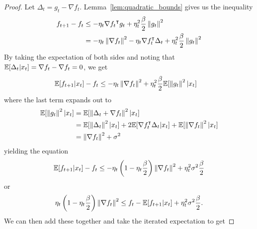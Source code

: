 \begin{proof}
    Let $\Delta_t = g_t - \nabla f_t$. Lemma~\ref{lem:quadratic_bounds} gives us
    the inequality
    \begin{equation}
        \begin{aligned}
            f_{t+1} - f_t &\leq - \eta_t {\nabla f_t}^\intercal g_t +
            \eta_t^2\frac{\beta}{2} \left\| g_t \right\|^2 \\
            &= - \eta_t \left\| \nabla f_t \right\|^2 - \eta_t \nabla f_t^\intercal \Delta_t +
            \eta_t^2\frac{\beta}{2} \left\| g_t \right\|^2
        \end{aligned}
    \end{equation}
    By taking the expectation of both sides and noting that $\mathbb E[\Delta_t |
    x_t] = \nabla f_t - \nabla f_t = 0$, we get
    \begin{equation}
        \begin{aligned}
            \mathbb E[f_{t+1} | x_t] - f_t &\leq - \eta_t \left\| \nabla f_t \right\|^2 +
            \eta_t^2\frac{\beta}{2} \mathbb E[\left\| g_t \right\|^2 | x_t]
        \end{aligned}
    \end{equation}
    where the last term expands out to
    \begin{equation}
        \begin{aligned}
            \mathbb E[\left\| g_t \right\|^2 | x_t] &= \mathbb E[\left\| \Delta_t + \nabla f_t \right\|^2 | x_t]
            \\
            &= \mathbb E[\left\| \Delta_t \right\|^2 | x_t] + 2 \mathbb E[\nabla f_t^\intercal \Delta_t
            | x_t] + \mathbb E[\left\| \nabla f_t \right\|^2 | x_t] \\
            &= \left\| \nabla f_t \right\|^2 + \sigma^2
        \end{aligned}
    \end{equation}
    yielding the equation
    \begin{equation}
        \begin{aligned}
            \mathbb E[f_{t+1} | x_t] - f_t \leq - \eta_t \left( 1 - \eta_t
            \frac{\beta}{2}  \right) \left\| \nabla f_t \right\|^2 +
            \eta_t^2\sigma^2 \frac{\beta}{2}
        \end{aligned}
    \end{equation}
    or
    \begin{equation}
        \eta_t \left( 1 - \eta_t
        \frac{\beta}{2}  \right) \left\| \nabla f_t \right\|^2  \leq f_t - \mathbb E[f_{t+1} | x_t] +
        \eta_t^2\sigma^2 \frac{\beta}{2}.
    \end{equation}
    We can then add these together and take the iterated expectation to get

\end{proof}

